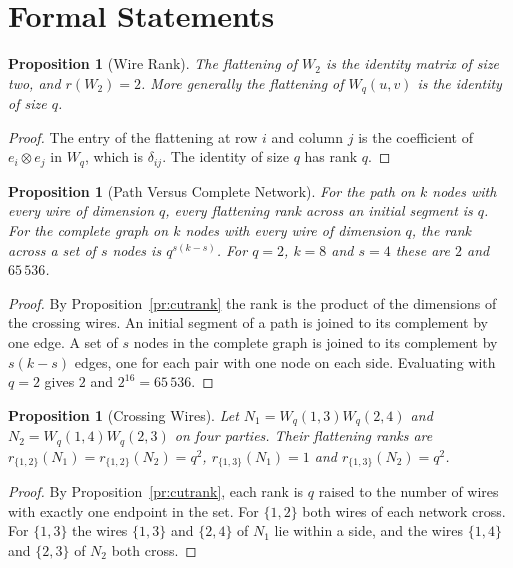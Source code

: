 \documentclass[11pt,letterpaper]{report}
\theoremstyle{plain}
\newtheorem{proposition}[theorem]{Proposition}
\theoremstyle{definition}
\theoremstyle{remark}
\begin{document}
\section{Formal Statements}

\begin{proposition}[Wire Rank]\label{pr:wirerank}
The flattening of $W_2$ is the identity matrix of size two, and $r(W_2)=2$. More generally the flattening of $W_q(u,v)$ is the identity of size $q$.
\end{proposition}
\begin{proof}
The entry of the flattening at row $i$ and column $j$ is the coefficient of $e_i\otimes e_j$ in $W_q$, which is $\delta_{ij}$. The identity of size $q$ has rank $q$.
\end{proof}

\begin{proposition}[Path Versus Complete Network]\label{pr:pathcomplete}
For the path on $k$ nodes with every wire of dimension $q$, every flattening rank across an initial segment is $q$. For the complete graph on $k$ nodes with every wire of dimension $q$, the rank across a set of $s$ nodes is $q^{s(k-s)}$. For $q=2$, $k=8$ and $s=4$ these are $2$ and $65\,536$.
\end{proposition}
\begin{proof}
By Proposition~\ref{pr:cutrank} the rank is the product of the dimensions of the crossing wires. An initial segment of a path is joined to its complement by one edge. A set of $s$ nodes in the complete graph is joined to its complement by $s(k-s)$ edges, one for each pair with one node on each side. Evaluating with $q=2$ gives $2$ and $2^{16}=65\,536$.
\end{proof}

\begin{proposition}[Crossing Wires]\label{pr:crossingwires}
Let $N_1=W_q(1,3)W_q(2,4)$ and $N_2=W_q(1,4)W_q(2,3)$ on four parties. Their flattening ranks are $r_{\{1,2\}}(N_1)=r_{\{1,2\}}(N_2)=q^2$, $r_{\{1,3\}}(N_1)=1$ and $r_{\{1,3\}}(N_2)=q^2$.
\end{proposition}
\begin{proof}
By Proposition~\ref{pr:cutrank}, each rank is $q$ raised to the number of wires with exactly one endpoint in the set. For $\{1,2\}$ both wires of each network cross. For $\{1,3\}$ the wires $\{1,3\}$ and $\{2,4\}$ of $N_1$ lie within a side, and the wires $\{1,4\}$ and $\{2,3\}$ of $N_2$ both cross.
\end{proof}
\end{document}
